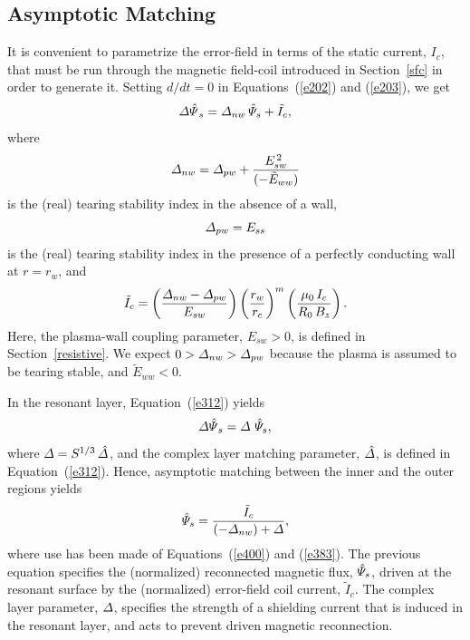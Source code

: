 \documentclass[notitlepage,12pt]{article}
\begin{document}
\subsection{Asymptotic Matching}
It is convenient to parametrize the error-field in terms of the static current, $I_c$, that must be run through the magnetic
field-coil introduced in Section~\ref{sfc} in order to generate it. Setting $d/dt=0$ in Equations~(\ref{e202}) and (\ref{e203}),
we get
\begin{equation}\label{e400}
{\mit\Delta\hat{\Psi}}_s = {\mit\Delta}_{nw}\,\hat{\mit\Psi}_s+\tilde{I}_c,
\end{equation}
where
\begin{equation}
{\mit\Delta}_{nw} = {\mit\Delta}_{pw} + \frac{E_{sw}^{\,2}}{(-\tilde{E}_{ww})}
\end{equation}
is the (real) tearing stability index in the absence of a wall, 
\begin{equation}\label{epw}
{\mit\Delta}_{pw}= E_{ss}
\end{equation}
 is the
(real) tearing stability index in the presence of a perfectly conducting wall at $r=r_w$, and
\begin{equation}
\tilde{I}_c =\left(\frac{{\mit\Delta}_{nw} - {\mit\Delta}_{pw}}{E_{sw}}\right)\left(
\frac{r_w}{r_c}\right)^m\left(\frac{\mu_0\,I_c}{R_0\,B_z}\right).
\end{equation}
Here, the plasma-wall coupling parameter, $E_{sw}>0$, is defined in Section~\ref{resistive}. We expect $0>{\mit\Delta}_{nw}>
{\mit\Delta}_{pw}$ because the plasma is assumed to be tearing stable, and $\tilde{E}_{ww}<0$. 

In the resonant layer, Equation~(\ref{e312}) yields
\begin{equation}\label{e383}
{\mit\Delta\hat{\Psi}}_s = {\mit\Delta}\,\,\hat{\mit\Psi}_s,
\end{equation}
where ${\mit\Delta} = S^{1/3}\,\hat{\mit\Delta}$, and the complex layer matching parameter, $\hat{\mit\Delta}$, is defined in 
Equation~(\ref{e312}). 
Hence, asymptotic matching between the inner and the outer regions yields
\begin{equation}\label{e384}
\hat{\mit\Psi}_s = \frac{\tilde{I}_c}{(-{\mit\Delta}_{nw}) + {\mit\Delta}},
\end{equation}
where use has been made of Equations~(\ref{e400}) and (\ref{e383}). 
The previous equation specifies the (normalized) reconnected magnetic flux, $\hat{\mit\Psi}_s$, driven at the resonant surface by the (normalized) 
error-field coil current, $\tilde{I}_c$. The complex layer parameter, ${\mit\Delta}$, specifies the strength of a shielding current
that is induced in the resonant layer, and acts to prevent driven magnetic reconnection. 
\end{document}
